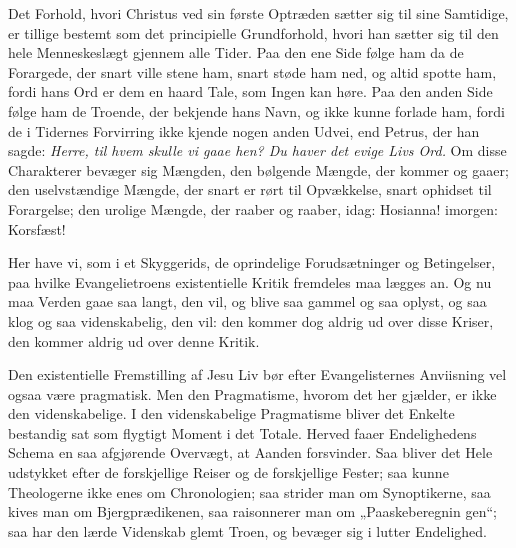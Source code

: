 \documentclass[12pt,a4paper]{book}
\newcommand{\opage}[1]{\marginnote{\footnotesize\textit{[#1]}}}
\begin{document}
\opage{93} Det Forhold, hvori Christus ved sin første Optræden sætter sig til sine
Samtidige, er tillige bestemt som det principielle Grundforhold, hvori
han sætter sig til den hele Menneskeslægt gjennem alle Tider. Paa den
ene Side følge ham da de Forargede, der snart ville stene ham, snart
støde ham ned, og altid spotte ham, fordi hans Ord er dem en haard Tale,
som Ingen kan høre. Paa den anden Side følge ham de Troende, der
bekjende hans Navn, og ikke kunne forlade ham, fordi de i Tidernes
Forvirring ikke kjende nogen anden Udvei, end Petrus, der han sagde:
\emph{Herre, til hvem skulle vi gaae hen? Du haver det evige Livs Ord.}
Om disse Charakterer bevæger sig Mængden, den bølgende Mængde, der
kommer og gaaer; den uselvstændige Mængde, der snart er rørt til
Opvækkelse, snart ophidset til Forargelse; den urolige Mængde, der raaber
og raaber, idag: Hosianna! imorgen: Korsfæst!

Her have vi, som i et Skyggerids, de oprindelige Forudsætninger og
Betingelser, paa hvilke Evangelietroens existentielle Kritik fremdeles
maa lægges an. Og nu maa Verden gaae saa langt, den vil, og blive saa
gammel og saa oplyst, og saa klog og saa videnskabelig, den vil: den
kommer dog aldrig ud over disse Kriser, den kommer aldrig ud over denne
Kritik.

Den existentielle Fremstilling af Jesu Liv bør efter Evangelisternes
Anviisning vel ogsaa være pragmatisk. Men den Pragmatisme, hvorom det
her gjælder, er ikke den videnskabelige. I den videnskabelige
Pragmatisme bliver det Enkelte bestandig sat som flygtigt Moment i det
Totale. Herved faaer Endelighedens Schema en saa afgjørende Overvægt, at
Aanden forsvinder. Saa bliver det Hele udstykket efter de forskjellige
Reiser og de forskjellige Fester; saa kunne Theologerne ikke enes om
Chronologien; saa strider man om Synoptikerne, saa kives man om
Bjergprædikenen, saa raisonnerer man om „Paaskeberegnin%
\opage{94}gen“; saa har den lærde Videnskab glemt Troen, og bevæger sig i lutter
Endelighed.
\end{document}
